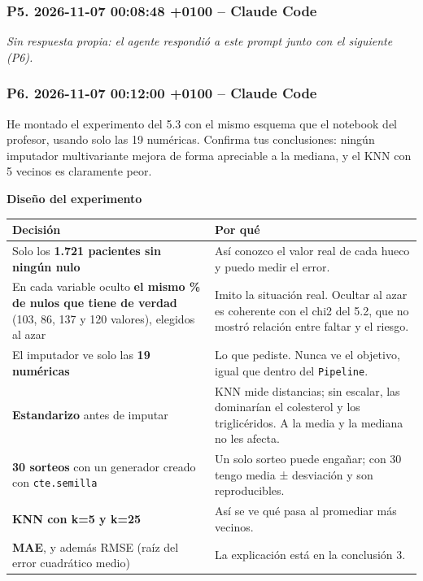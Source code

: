 \documentclass[11pt,a4paper]{article}
\begin{document}
\subsubsection*{P5. 2026-11-07 00:08:48 +0100 -- Claude Code}
\textit{Sin respuesta propia: el agente respondió a este prompt junto con el siguiente (P6).}

\subsubsection*{P6. 2026-11-07 00:12:00 +0100 -- Claude Code}
{\small
He montado el experimento del 5.3 con el mismo esquema que el notebook del profesor, usando solo las 19 numéricas. Confirma tus conclusiones: ningún imputador multivariante mejora de forma apreciable a la mediana, y el KNN con 5 vecinos es claramente peor.

\smallskip\noindent\textbf{Diseño del experimento}\par
{\footnotesize\noindent\begin{tabularx}{\linewidth}{>{\raggedright\arraybackslash}X>{\raggedright\arraybackslash}X}
\toprule
\textbf{Decisión} & \textbf{Por qué} \\
\midrule
Solo los \textbf{1.721 pacientes sin ningún nulo} & Así conozco el valor real de cada hueco y puedo medir el error. \\
En cada variable oculto \textbf{el mismo \% de nulos que tiene de verdad} (103, 86, 137 y 120 valores), elegidos al azar & Imito la situación real. Ocultar al azar es coherente con el chi2 del 5.2, que no mostró relación entre faltar y el riesgo. \\
El imputador ve solo las \textbf{19 numéricas} & Lo que pediste. Nunca ve el objetivo, igual que dentro del \texttt{Pipeline}. \\
\textbf{Estandarizo} antes de imputar & KNN mide distancias; sin escalar, las dominarían el colesterol y los triglicéridos. A la media y la mediana no les afecta. \\
\textbf{30 sorteos} con un generador creado con \texttt{cte.semilla} & Un solo sorteo puede engañar; con 30 tengo media ± desviación y son reproducibles. \\
\textbf{KNN con k=5 y k=25} & Así se ve qué pasa al promediar más vecinos. \\
\textbf{MAE}, y además RMSE (raíz del error cuadrático medio) & La explicación está en la conclusión 3. \\
\bottomrule
\end{tabularx}}

}
\end{document}
